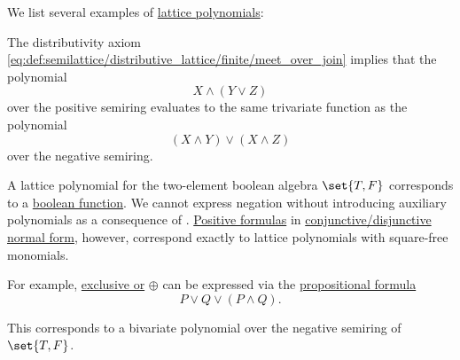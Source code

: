 \begin{example}\label{ex:lattice_polynomials}
  We list several examples of \hyperref[rem:lattice_polynomials]{lattice polynomials}:
  \begin{thmenum}
     The distributivity axiom \eqref{eq:def:semilattice/distributive_lattice/finite/meet_over_join} implies that the polynomial
    \begin{equation*}
      X \wedge (Y \vee Z)
    \end{equation*}
    over the positive semiring evaluates to the same trivariate function as the polynomial
    \begin{equation*}
      (X \wedge Y) \vee (X \wedge Z)
    \end{equation*}
    over the negative semiring.

     A lattice polynomial for the two-element boolean algebra \hyperref[def:boolean_value]{\( \set{ T, F } \)} corresponds to a \hyperref[def:boolean_function]{boolean function}. We cannot express negation without introducing auxiliary polynomials as a consequence of . \hyperref[def:positive_formula]{Positive formulas} in \hyperref[def:cnf_and_dnf]{conjunctive/disjunctive normal form}, however, correspond exactly to lattice polynomials with square-free monomials.

    For example, \hyperref[def:standard_boolean_operators]{exclusive or} \( \oplus \) can be expressed via the \hyperref[def:propositional_syntax/formula]{propositional formula}
    \begin{equation*}
      P \vee Q \vee (P \wedge Q).
    \end{equation*}

    This corresponds to a bivariate polynomial over the negative semiring of \( \set{ T, F } \).
  \end{thmenum}
\end{example}

